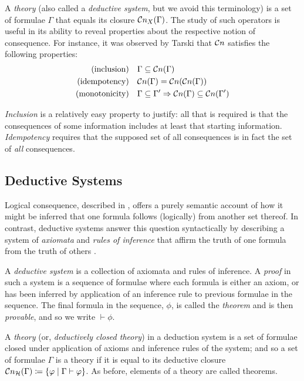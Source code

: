 A \textit{theory} (also called a \textit{deductive system}, but we avoid this terminology) is a set of formulae $\Gamma$ that equals its closure $\mathcal{C}n_X (\Gamma)$. The study of such operators is useful in its ability to reveal properties about the respective notion of consequence. For instance, it was observed by Tarski \cite[p. 84]{tarski1936operator} that $\mathcal{C}n$ satisfies the following properties:
%
\begin{align}
     \text{(inclusion)} & \quad \Gamma \subseteq \mathcal{C}n (\Gamma) \\
     \text{(idempotency)} & \quad  \mathcal{C}n (\Gamma) = \mathcal{C}n (\mathcal{C}n (\Gamma)) \\
     \text{(monotonicity)} & \quad \Gamma \subseteq \Gamma' \Rightarrow \mathcal{C}n (\Gamma) \subseteq \mathcal{C}n (\Gamma')
\end{align}

\textit{Inclusion} is a relatively easy property to justify: all that is required is that the consequences of some information includes at least that starting information. \textit{Idempotency} requires that the supposed set of all consequences is in fact the set of \textit{all} consequences.

\subsection{Deductive Systems}
\label{subsection:deduction-systems}
  
Logical consequence, described in , offers a purely semantic account of how it might be inferred that one formula follows (logically) from another set thereof. In contrast, deductive systems answer this question syntactically by describing a system of \textit{axiomata} and \textit{rules of inference} that affirm the truth of one formula from the truth of others \cite[p. 49]{Ben1993Mathematical}.

\begin{definition}
\label{definition:deductive-system}
A \textit{deductive system} is a collection of axiomata and rules of inference. A \textit{proof} in such a system is a sequence of formulae where each formula is either an axiom, or has been inferred by application of an inference rule to previous formulae in the sequence. The final formula in the sequence, $\phi$, is called the \textit{theorem} and is then \textit{provable}, and so we write $\vdash \phi$.

A \textit{theory} (or, \textit{deductively closed theory}) in a deduction system is a set of formulae closed under application of axioms and inference rules of the system; and so a set of formulae $\Gamma$ is a theory if it is equal to its deductive closure $\mathcal{C}n_\mathcal{H} (\Gamma) \coloneqq \{\varphi \mid \Gamma \vdash \varphi \}$. As before, elements of a theory are called theorems.
\end{definition}

